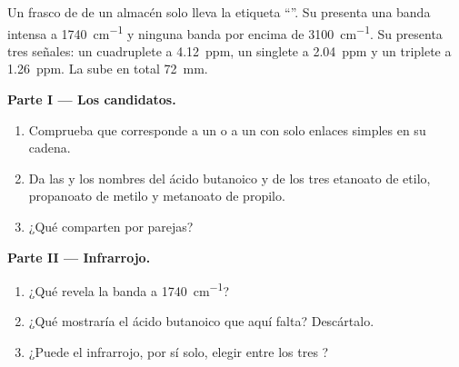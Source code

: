 \begin{problem}
\label{pb:g12:proton-nmr:1}
Un frasco de  de un almacén solo lleva la etiqueta
``''. Su  presenta una banda intensa a
\qty{1740}{cm^{-1}} y ninguna banda por encima de \qty{3100}{cm^{-1}}.
Su  presenta tres señales: un cuadruplete a
\qty{4.12}{ppm}, un singlete a \qty{2.04}{ppm} y un triplete a
\qty{1.26}{ppm}. La  sube en total \qty{72}{mm}.

\medskip
\noindent\textbf{Parte I --- Los candidatos.}
\begin{enumerate}
  \item Comprueba que  corresponde a un  o a un  con solo enlaces simples en su cadena.
  \item Da las  y los nombres del ácido
        butanoico y de los tres  etanoato de etilo, propanoato de
        metilo y metanoato de propilo.
  \item ¿Qué  comparten por parejas?
\end{enumerate}

\medskip
\noindent\textbf{Parte II --- Infrarrojo.}
\begin{enumerate}[resume]
  \item ¿Qué revela la banda a \qty{1740}{cm^{-1}}?
  \item ¿Qué mostraría el ácido butanoico que aquí falta? Descártalo.
  \item ¿Puede el infrarrojo, por sí solo, elegir entre los tres ?
\end{enumerate}


\end{problem}

